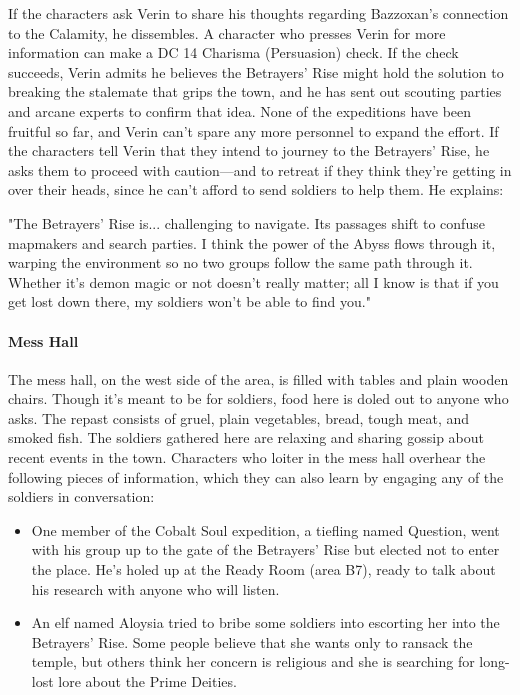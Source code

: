 \documentclass[10pt,a4,twoside,twocolumn,openany,nodeprecatedcode]{dndbook}
\begin{document}
If the characters ask Verin to share his thoughts regarding Bazzoxan's connection to the Calamity, he dissembles. A character who presses Verin for more information can make a DC 14 Charisma (Persuasion) check. If the check succeeds, Verin admits he believes the Betrayers' Rise might hold the solution to breaking the stalemate that grips the town, and he has sent out scouting parties and arcane experts to confirm that idea. None of the expeditions have been fruitful so far, and Verin can't spare any more personnel to expand the effort.
If the characters tell Verin that they intend to journey to the Betrayers' Rise, he asks them to proceed with caution—and to retreat if they think they're getting in over their heads, since he can't afford to send soldiers to help them. He explains:
\begin{DndReadAloud}{}
"The Betrayers' Rise is... challenging to navigate. Its passages shift to confuse mapmakers and search parties. I think the power of the Abyss flows through it, warping the environment so no two groups follow the same path through it. Whether it's demon magic or not doesn't really matter; all I know is that if you get lost down there, my soldiers won't be able to find you."
\end{DndReadAloud}

\paragraph{Mess Hall}
The mess hall, on the west side of the area, is filled with tables and plain wooden chairs. Though it's meant to be for soldiers, food here is doled out to anyone who asks. The repast consists of gruel, plain vegetables, bread, tough meat, and smoked fish.
The soldiers gathered here are relaxing and sharing gossip about recent events in the town. Characters who loiter in the mess hall overhear the following pieces of information, which they can also learn by engaging any of the soldiers in conversation:
\begin{itemize}

\item One member of the Cobalt Soul expedition, a tiefling named Question, went with his group up to the gate of the Betrayers' Rise but elected not to enter the place. He's holed up at the Ready Room (area B7), ready to talk about his research with anyone who will listen.
\item An elf named Aloysia tried to bribe some soldiers into escorting her into the Betrayers' Rise. Some people believe that she wants only to ransack the temple, but others think her concern is religious and she is searching for long-lost lore about the Prime Deities.
\end{itemize}
\end{document}

